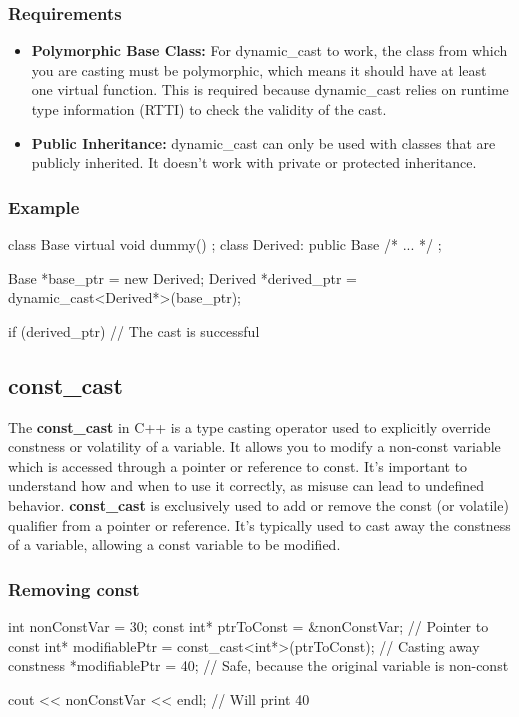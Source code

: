 \documentclass{report}
\begin{document}
   \bigbreak \noindent 
   \subsubsection{Requirements}
   \begin{itemize}
        \item \textbf{Polymorphic Base Class:} For dynamic_cast to work, the class from which you are casting must be polymorphic, which means it should have at least one virtual function. This is required because dynamic_cast relies on runtime type information (RTTI) to check the validity of the cast.
        \item \textbf{Public Inheritance:} dynamic_cast can only be used with classes that are publicly inherited. It doesn’t work with private or protected inheritance.
   \end{itemize}

   \bigbreak \noindent 
   \subsubsection{Example}
   \bigbreak \noindent 
   \begin{cppcode}
class Base { virtual void dummy() {} };
class Derived: public Base { /* ... */ };

Base *base_ptr = new Derived;
Derived *derived_ptr = dynamic_cast<Derived*>(base_ptr);

if (derived_ptr) {
    // The cast is successful
}
   \end{cppcode}
    

    \bigbreak \noindent 
    \subsection{const\_cast}
    \bigbreak \noindent 
    \begin{concept}
        The \textbf{const\_cast} in C++ is a type casting operator used to explicitly override constness or volatility of a variable. It allows you to modify a non-const variable which is accessed through a pointer or reference to const. It's important to understand how and when to use it correctly, as misuse can lead to undefined behavior.
        \bigbreak \noindent 
        \textbf{const\_cast} is exclusively used to add or remove the const (or volatile) qualifier from a pointer or reference. It's typically used to cast away the constness of a variable, allowing a const variable to be modified.
    \end{concept}
    \subsubsection{Removing const}
    \bigbreak \noindent 
    \begin{cppcode}
    int nonConstVar = 30;
    const int* ptrToConst = &nonConstVar; // Pointer to const
    int* modifiablePtr = const_cast<int*>(ptrToConst); // Casting away constness
    *modifiablePtr = 40; // Safe, because the original variable is non-const

    cout << nonConstVar << endl; // Will print 40
    \end{cppcode}
\end{document}
